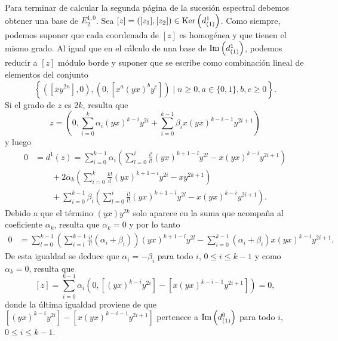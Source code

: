 \documentclass[fleqn,../tesis.tex]{subfiles}
\begin{document}
Para terminar de calcular la segunda página de la sucesión espectral debemos obtener una base de $E^{1, 0}_{2}$.
Sea $[z] = ([z_1], [z_2]) \in \operatorname{Ker}\left(d^{1}_{(1)}\right)$. Como siempre, podemos suponer que cada coordenada de $[z]$
es homogénea y que tienen el mismo grado. Al igual que en el cálculo de una base de $\operatorname{Im}\left(d^{1}_{(1)}\right)$, podemos
reducir a $[z]$ módulo borde y suponer que se escribe como combinación lineal de elementos del conjunto
\[
    \left\lbrace \left(\left[xy^{2n}\right], 0\right), \left(0, \left[x^{a}(yx)^{b}y^c\right]\right)
        \mid n \geq 0, a \in \{0, 1\}, b, c \geq 0  \right\rbrace.
\] 
Si el grado de $z$ es $2k$, resulta que
\[
    z = \left(0, \sum_{i = 0}^{k}\alpha_i (yx)^{k - i}y^{2i}
+ \sum_{i = 0}^{k - 1}\beta_i x(yx)^{k - i - 1}y^{2i + 1}\right)
\]
y luego
\begin{align*}
    0 &= d^{1}(z) = \sum_{i = 0}^{k - 1}\alpha_i \left(\sum_{l = 0}^{i}\frac{i!}{l!}(yx)^{k + 1 - l}y^{2l} - x(yx)^{k - i}y^{2i + 1}\right)\\
    &\qquad + 2\alpha_k \left(\sum_{i = 0}^{k}\frac{k!}{i!}(yx)^{k + 1 -i}y^{2i} - xy^{2k + 1}\right)\\
    &\qquad+ \sum_{i = 0}^{k - 1}\beta_i\left(\sum_{l = 0}^{i}\frac{i!}{l!}(yx)^{k + 1 - l}y^{2l} - x(yx)^{k - i}y^{2i + 1}\right).
\end{align*}
Debido a que el término $(yx)y^{2k}$ solo aparece en la suma que acompaña al coeficiente $\alpha_k$, resulta que $\alpha_k = 0$ y por
lo tanto
\begin{align*}
    0 &=  \sum_{l =0}^{k - 1} \left(\sum_{i = l}^{k - 1}\frac{i!}{l!}(\alpha_i + \beta_i)\right)(yx)^{k + 1 -l}y^{2l}
        - \sum_{i = 0}^{k - 1}\left(\alpha_i + \beta_i\right)x(yx)^{k - i}y^{2i + 1}.
\end{align*}
De esta igualdad se deduce que $\alpha_i = -\beta_i$ para todo $i$, $0\leq i \leq k - 1$ y como $\alpha_k = 0$, resulta que
\[
    [z] = \sum_{i = 0}^{k - 1}\alpha_i\left(0, \left[(yx)^{k - i}y^{2i}\right] -\left[x (yx)^{k - i - 1}y^{2i + 1}\right]\right) = 0,
\]
donde la última igualdad proviene de que $\left[(yx)^{k - i}y^{2i}\right] - \left[x(yx)^{k - i - 1}y^{2i + 1}\right]$ pertenece a $\operatorname{Im}\left(d^{0}_{(1)}\right)$ para todo $i$, $0\leq i \leq k - 1$.
\end{document}
